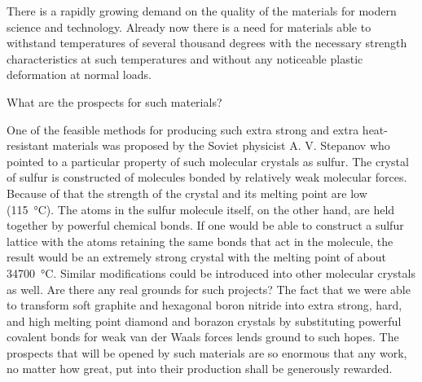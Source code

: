 There is a rapidly growing demand on the quality of the materials for modern science and technology. Already now there is a need for materials able to withstand temperatures of several thousand degrees with the necessary strength characteristics at such temperatures and without any noticeable plastic deformation at normal loads.

What are the prospects for such materials?

One of the feasible methods for producing such extra strong and extra heat-resistant materials was proposed by the Soviet physicist A. V. Stepanov who pointed to a particular property of such molecular crystals as sulfur. The crystal of sulfur is constructed of molecules bonded by relatively weak molecular forces. Because of that the strength of the crystal and its melting point are low (\SI{115}{\degreeCelsius}). The atoms in the sulfur molecule itself, on the other hand, are held together by powerful chemical bonds. If one would be able to construct a sulfur lattice with the atoms retaining the same bonds that act in the molecule, the result would be an extremely strong crystal with the melting point of about \SI{34700}{\degreeCelsius}. Similar modifications could be introduced into other molecular crystals as well. Are there any real grounds for such projects? The fact that we were able to transform soft graphite and hexagonal boron nitride into extra strong, hard, and high melting point diamond and borazon crystals by substituting powerful covalent bonds for weak van der Waals forces lends ground to such hopes. The prospects that will be opened by such materials are so enormous that any work, no matter how great, put into their production shall be generously rewarded.
